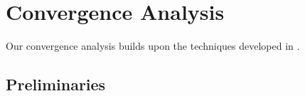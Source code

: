 \documentclass{article}
\theoremstyle{plain}
\theoremstyle{definition}
\newtheorem{definition}[theorem]{Definition}
\theoremstyle{remark}
\begin{document}
\section{Convergence Analysis}\label{app:convergence}
Our convergence analysis builds upon the techniques developed in \citep{gower2019sgd_convergence, khaled2020better_sgd, oikonomou2025sam_convergence}.

\subsection{Preliminaries}

\end{document}
